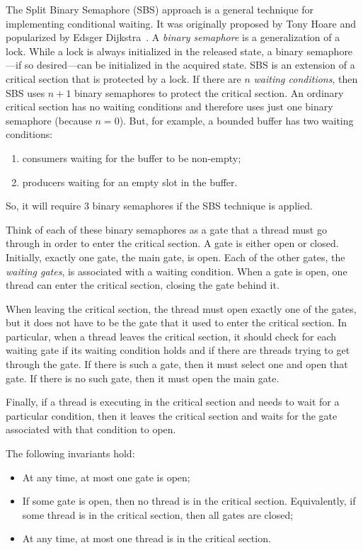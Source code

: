 \documentclass{report}
\begin{document}
%

The Split Binary Semaphore (SBS) approach is a general technique for
implementing conditional waiting.  It was originally proposed by
Tony Hoare and popularized by Edsger Dijkstra~\cite{EWD703}.
A \emph{binary semaphore} is a generalization of a lock.  While a lock
is always initialized in the released state, a binary semaphore---if so
desired---can be initialized in the acquired state.
SBS is an extension of a critical section that is protected by a lock.
If there are $n$ \emph{waiting conditions},
then SBS uses $n+1$ binary semaphores to protect the critical section.
An ordinary critical section has no waiting conditions and therefore
uses just one binary semaphore (because $n = 0$).
But, for example, a bounded buffer has two waiting conditions:
\begin{enumerate}
\item consumers waiting for the buffer to be non-empty;
\item producers waiting for an empty slot in the buffer.
\end{enumerate}
So, it will require 3 binary semaphores if the SBS technique is applied.

Think of each of these binary semaphores as a gate that a thread must go
through in order to enter the critical section.  A gate is either open
or closed.  Initially, exactly one gate, the main gate, is open.
Each of the other gates, the \emph{waiting gates}, is associated with a
waiting condition.
When a gate is open, one thread can enter the critical section,
closing the gate behind it.

When leaving the critical section, the thread must open exactly one
of the gates, but it does not have to be the gate that it used to enter
the critical section.
In particular, when a thread leaves the critical section, it should
check for each waiting gate if its waiting condition holds and if there are
threads trying to get through the gate.  If there is such a gate, then
it must select one and open that gate.  If there is no such gate, then
it must open the main gate.

Finally, if a thread is executing in the critical section and needs to
wait for a particular condition, then it leaves the critical section and
waits for the gate associated with that condition to open.

The following invariants hold:
\begin{itemize}
\item At any time, at most one gate is open;
\item If some gate is open, then no thread is in the critical section.  Equivalently, if some thread is in the critical section, then all gates are closed;
\item At any time, at most one thread is in the critical section.
\end{itemize}
\end{document}
